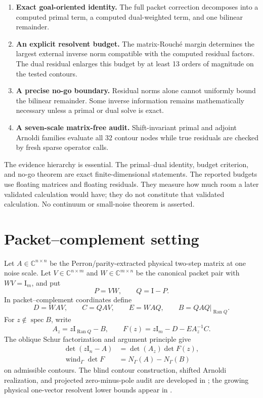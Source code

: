 \documentclass[11pt]{article}
\theoremstyle{definition}
\theoremstyle{remark}
\newcommand{\C}{\mathbb C}
\newcommand{\Id}{\mathrm I}
\newcommand{\Ran}{\operatorname{Ran}}
\newcommand{\spec}{\operatorname{spec}}
\newcommand{\wind}{\operatorname{wind}}
\begin{document}
\begin{enumerate}[label=\textbf{P\arabic*.},leftmargin=2.8em]
 \item \textbf{Exact goal-oriented identity.}  The full packet correction
 decomposes into a computed primal term, a computed dual-weighted term, and
 one bilinear remainder.
 \item \textbf{An explicit resolvent budget.}  The matrix-Rouch\'e margin
 determines the largest external inverse norm compatible with the computed
 residual factors.  The dual residual enlarges this budget by at least 13
 orders of magnitude on the tested contours.
 \item \textbf{A precise no-go boundary.}  Residual norms alone cannot
 uniformly bound the bilinear remainder.  Some inverse information remains
 mathematically necessary unless a primal or dual solve is exact.
 \item \textbf{A seven-scale matrix-free audit.}  Shift-invariant primal and
 adjoint Arnoldi families evaluate all 32 contour nodes while true residuals
 are checked by fresh sparse operator calls.
\end{enumerate}

The evidence hierarchy is essential.  The primal--dual identity, budget
criterion, and no-go theorem are exact finite-dimensional statements.  The
reported budgets use floating matrices and floating residuals.  They
measure how much room a later validated calculation would have; they do not
constitute that validated calculation.  No continuum or small-noise theorem
is asserted.

\section{Packet--complement setting}
\label{sec:setting}

Let \(A\in\C^{n\times n}\) be the Perron/parity-extracted physical
two-step matrix at one noise scale.  Let \(V\in\C^{n\times m}\) and
\(W\in\C^{m\times n}\) be the canonical packet pair with \(WV=\Id_m\),
and put
\[
 P=VW,\qquad Q=\Id-P.
\]
In packet--complement coordinates define
\begin{equation}
 D=WAV,\qquad C=QAV,\qquad E=WAQ,
 \qquad B=QAQ\big|_{\Ran Q}.
 \label{eq:blocks}
\end{equation}
For \(z\notin\spec B\), write
\begin{equation}
 A_z=z\Id_{\Ran Q}-B,
 \qquad
 F(z)=z\Id_m-D-EA_z^{-1}C.
 \label{eq:az-f}
\end{equation}
The oblique Schur factorization and argument principle give
\begin{align}
 \det(z\Id_n-A)&=\det(A_z)\det F(z),
 \label{eq:det-factorization}\\
 \wind_\Gamma\det F&=N_\Gamma(A)-N_\Gamma(B)
 \label{eq:winding-count}
\end{align}
on admissible contours.  The blind contour construction, shifted Arnoldi
realization, and projected zero-minus-pole audit are developed in
\citet{WangContourFeshbach2026}; the growing physical one-vector resolvent
lower bounds appear in \citet{WangPhysicalFeshbach2026}.
\end{document}
